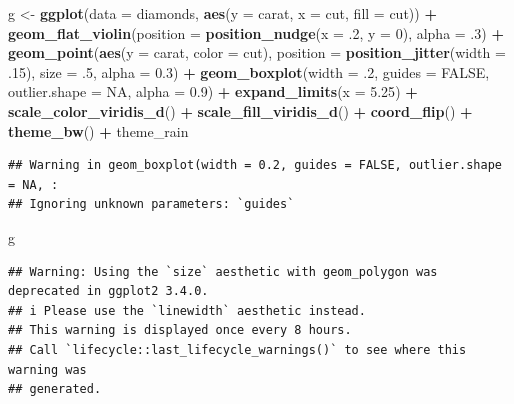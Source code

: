\documentclass[
]{article}
\newenvironment{Shaded}{\begin{snugshade}}{\end{snugshade}}
\newcommand{\AttributeTok}[1]{\textcolor[rgb]{0.13,0.29,0.53}{#1}}
\newcommand{\ConstantTok}[1]{\textcolor[rgb]{0.56,0.35,0.01}{#1}}
\newcommand{\DecValTok}[1]{\textcolor[rgb]{0.00,0.00,0.81}{#1}}
\newcommand{\FloatTok}[1]{\textcolor[rgb]{0.00,0.00,0.81}{#1}}
\newcommand{\FunctionTok}[1]{\textcolor[rgb]{0.13,0.29,0.53}{\textbf{#1}}}
\newcommand{\NormalTok}[1]{#1}
\newcommand{\OtherTok}[1]{\textcolor[rgb]{0.56,0.35,0.01}{#1}}
\newcommand{\SpecialCharTok}[1]{\textcolor[rgb]{0.81,0.36,0.00}{\textbf{#1}}}
\begin{document}
\begin{Shaded}
\begin{Highlighting}[]
\NormalTok{g }\OtherTok{\textless{}{-}} \FunctionTok{ggplot}\NormalTok{(}\AttributeTok{data =}\NormalTok{ diamonds, }\FunctionTok{aes}\NormalTok{(}\AttributeTok{y =}\NormalTok{ carat, }\AttributeTok{x =}\NormalTok{ cut, }\AttributeTok{fill =}\NormalTok{ cut)) }\SpecialCharTok{+}
\FunctionTok{geom\_flat\_violin}\NormalTok{(}\AttributeTok{position =} \FunctionTok{position\_nudge}\NormalTok{(}\AttributeTok{x =}\NormalTok{ .}\DecValTok{2}\NormalTok{, }\AttributeTok{y =} \DecValTok{0}\NormalTok{), }\AttributeTok{alpha =}\NormalTok{ .}\DecValTok{3}\NormalTok{) }\SpecialCharTok{+}
\FunctionTok{geom\_point}\NormalTok{(}\FunctionTok{aes}\NormalTok{(}\AttributeTok{y =}\NormalTok{ carat, }\AttributeTok{color =}\NormalTok{ cut), }\AttributeTok{position =} \FunctionTok{position\_jitter}\NormalTok{(}\AttributeTok{width =}\NormalTok{ .}\DecValTok{15}\NormalTok{), }\AttributeTok{size =}\NormalTok{ .}\DecValTok{5}\NormalTok{, }\AttributeTok{alpha =} \FloatTok{0.3}\NormalTok{) }\SpecialCharTok{+}
\FunctionTok{geom\_boxplot}\NormalTok{(}\AttributeTok{width =}\NormalTok{ .}\DecValTok{2}\NormalTok{, }\AttributeTok{guides =} \ConstantTok{FALSE}\NormalTok{, }\AttributeTok{outlier.shape =} \ConstantTok{NA}\NormalTok{, }\AttributeTok{alpha =} \FloatTok{0.9}\NormalTok{) }\SpecialCharTok{+}
\FunctionTok{expand\_limits}\NormalTok{(}\AttributeTok{x =} \FloatTok{5.25}\NormalTok{) }\SpecialCharTok{+}
\FunctionTok{scale\_color\_viridis\_d}\NormalTok{() }\SpecialCharTok{+}
\FunctionTok{scale\_fill\_viridis\_d}\NormalTok{() }\SpecialCharTok{+}
\FunctionTok{coord\_flip}\NormalTok{() }\SpecialCharTok{+}
\FunctionTok{theme\_bw}\NormalTok{() }\SpecialCharTok{+}
\NormalTok{theme\_rain}
\end{Highlighting}
\end{Shaded}

\begin{verbatim}
## Warning in geom_boxplot(width = 0.2, guides = FALSE, outlier.shape = NA, :
## Ignoring unknown parameters: `guides`
\end{verbatim}

\begin{Shaded}
\begin{Highlighting}[]
\NormalTok{g}
\end{Highlighting}
\end{Shaded}

\begin{verbatim}
## Warning: Using the `size` aesthetic with geom_polygon was deprecated in ggplot2 3.4.0.
## i Please use the `linewidth` aesthetic instead.
## This warning is displayed once every 8 hours.
## Call `lifecycle::last_lifecycle_warnings()` to see where this warning was
## generated.
\end{verbatim}
\end{document}
